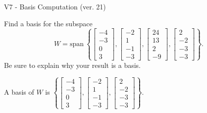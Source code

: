 \begin{exercise}
  \begin{exerciseTitle}V7 - Basis Computation (ver. 21)\end{exerciseTitle}
  \begin{exerciseStatement}
    Find a basis for the subspace 
\[W=\mathrm{span}\ \left\{\left[\begin{array}{r}
-4 \\
-3 \\
0 \\
3
\end{array}\right] , \left[\begin{array}{r}
-2 \\
1 \\
-1 \\
-3
\end{array}\right] , \left[\begin{array}{r}
24 \\
13 \\
2 \\
-9
\end{array}\right] , \left[\begin{array}{r}
2 \\
-2 \\
-3 \\
-3
\end{array}\right]\right\}.\]
 Be sure to explain why your result is a basis.


  \end{exerciseStatement}
  \begin{exerciseAnswer}
   A basis of \(W\) is  \(\left\{\left[\begin{array}{r}
-4 \\
-3 \\
0 \\
3
\end{array}\right] , \left[\begin{array}{r}
-2 \\
1 \\
-1 \\
-3
\end{array}\right] , \left[\begin{array}{r}
2 \\
-2 \\
-3 \\
-3
\end{array}\right]\right\}\).
  


  \end{exerciseAnswer}
\end{exercise}